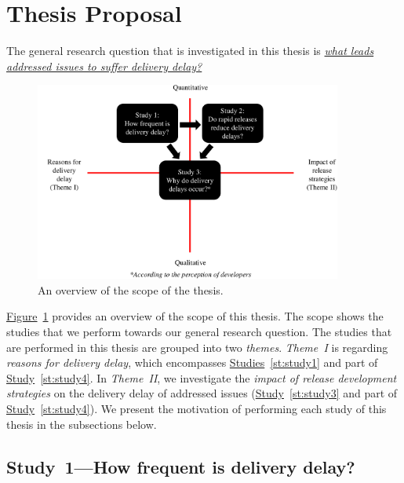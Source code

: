 \section{Thesis Proposal} \label{sec:thesis_overview}

\begin{sloppypar}
The general research question that is investigated in this thesis is {\em
\underline{what leads addressed issues to suffer delivery delay?}}
\end{sloppypar}

\begin{figure}[t]
	\centering
	\includegraphics[width=0.90\textwidth,keepaspectratio]
	{chapters/chapter1/figures/thesis_overview.pdf}
	\caption{An overview of the scope of the thesis.}
	\label{fig:thesis_overview}
\end{figure}

\hyperref[fig:thesis_overview]{Figure}~\ref{fig:thesis_overview} provides an
overview of the scope of this thesis. The scope shows the studies that we
perform towards our general research question. The studies that are performed in
this thesis are grouped into two {\em themes}. {\em
Theme~I} is regarding {\em reasons for delivery delay},
which encompasses \hyperref[st:study1]{Studies}~\ref{st:study1} and part of
\hyperref[st:study4]{Study}~\ref{st:study4}. In {\em
Theme~II}, we investigate the {\em impact of release
development strategies} on the delivery delay of addressed issues
(\hyperref[st:study3]{Study}~\ref{st:study3} and part of
\hyperref[st:study4]{Study}~\ref{st:study4}). We present the motivation of
performing each study of this thesis in the subsections below.

\subsection{Study~1---How frequent is delivery delay?}

